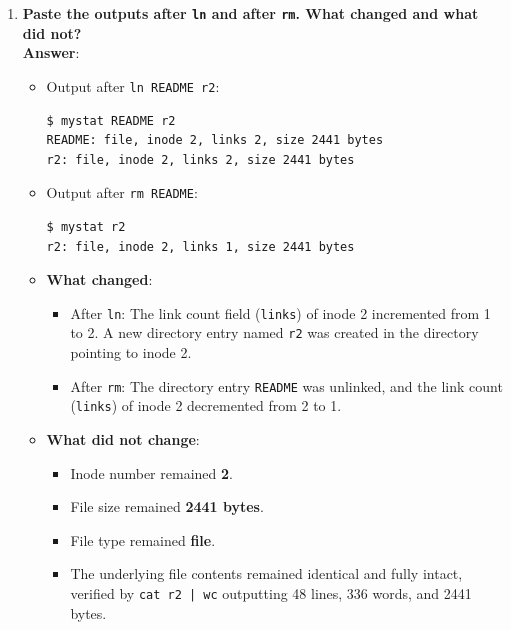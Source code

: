 \documentclass[12pt,a4paper]{article}
\begin{document}
\begin{enumerate}
    \item \textbf{Paste the outputs after \texttt{ln} and after \texttt{rm}. What changed and what did not?} \\
    \textbf{Answer}:
    \begin{itemize}
        \item Output after \texttt{ln README r2}:
        \begin{lstlisting}[style=consolestyle]
$ mystat README r2
README: file, inode 2, links 2, size 2441 bytes
r2: file, inode 2, links 2, size 2441 bytes
        \end{lstlisting}
        \item Output after \texttt{rm README}:
        \begin{lstlisting}[style=consolestyle]
$ mystat r2
r2: file, inode 2, links 1, size 2441 bytes
        \end{lstlisting}
        \item \textbf{What changed}:
        \begin{itemize}
            \item After \texttt{ln}: The link count field (\texttt{links}) of inode 2 incremented from 1 to 2. A new directory entry named \texttt{r2} was created in the directory pointing to inode 2.
            \item After \texttt{rm}: The directory entry \texttt{README} was unlinked, and the link count (\texttt{links}) of inode 2 decremented from 2 to 1.
        \end{itemize}
        \item \textbf{What did not change}:
        \begin{itemize}
            \item Inode number remained \textbf{2}.
            \item File size remained \textbf{2441 bytes}.
            \item File type remained \textbf{file}.
            \item The underlying file contents remained identical and fully intact, verified by \texttt{cat r2 | wc} outputting 48 lines, 336 words, and 2441 bytes.
        \end{itemize}
    \end{itemize}


\end{enumerate}
\end{document}
